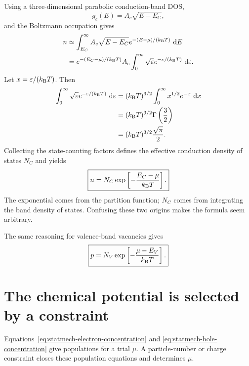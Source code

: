Using a three-dimensional parabolic conduction-band DOS,
\begin{equation}
  g_c(E)=A_c\sqrt{E-E_C},
  \label{eq:statmech-parabolic-conduction-dos}
\end{equation}
and the Boltzmann occupation gives
\begin{equation}
\begin{aligned}
  n
  &\simeq\int_{E_C}^{\infty}
    A_c\sqrt{E-E_C}
    e^{-(E-\mu)/(k_{\mathrm B} T)}\,\mathop{}\!\mathrm{d} E\\
  &=e^{-(E_C-\mu)/(k_{\mathrm B} T)}
    A_c\int_0^\infty
    \sqrt{\varepsilon}
    e^{-\varepsilon/(k_{\mathrm B} T)}\,\mathop{}\!\mathrm{d}\varepsilon.
\end{aligned}
  \label{eq:statmech-boltzmann-electron-integral}
\end{equation}
Let $x=\varepsilon/(k_{\mathrm B} T)$.  Then
\begin{equation}
\begin{aligned}
  \int_0^\infty\sqrt{\varepsilon}
  e^{-\varepsilon/(k_{\mathrm B} T)}\,\mathop{}\!\mathrm{d}\varepsilon
  &=(k_{\mathrm B} T)^{3/2}
    \int_0^\infty x^{1/2}e^{-x}\,\mathop{}\!\mathrm{d} x\\
  &=(k_{\mathrm B} T)^{3/2}\Gamma\left(\frac32\right)\\
  &=(k_{\mathrm B} T)^{3/2}\frac{\sqrt\pi}{2}.
\end{aligned}
  \label{eq:statmech-gamma-integral}
\end{equation}
Collecting the state-counting factors defines the effective conduction density
of states $N_C$ and yields
\begin{equation}
  \boxed{
  n=N_C\exp\left[-\frac{E_C-\mu}{k_{\mathrm B} T}\right].
  }
  \label{eq:statmech-nondegenerate-electron-result}
\end{equation}
The exponential comes from the partition function; $N_C$ comes from integrating
the band density of states.  Confusing these two origins makes the formula seem
arbitrary.

The same reasoning for valence-band vacancies gives
\begin{equation}
  \boxed{
  p=N_V\exp\left[-\frac{\mu-E_V}{k_{\mathrm B} T}\right].
  }
  \label{eq:statmech-nondegenerate-hole-result}
\end{equation}

\section{The chemical potential is selected by a constraint}

Equations~\eqref{eq:statmech-electron-concentration} and
\eqref{eq:statmech-hole-concentration} give populations for a trial $\mu$.
A particle-number or charge constraint closes these population equations and
determines $\mu$.

